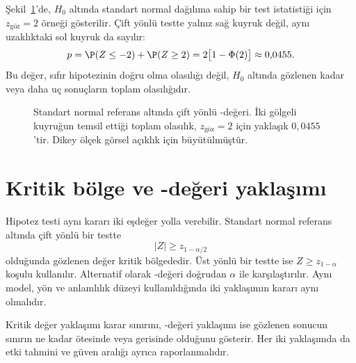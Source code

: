 Şekil~\ref{fig:pvalue-two-tails}'de, $H_0$ altında standart normal
dağılıma sahip bir test istatistiği için $z_{\text{göz}}=2$ örneği
gösterilir. Çift yönlü testte yalnız sağ kuyruk değil, aynı uzaklıktaki
sol kuyruk da sayılır:
\[
p=\P(Z\leq-2)+\P(Z\geq2)
  =2\bigl[1-\Phi(2)\bigr]\approx0{,}0455.
\]
Bu değer, sıfır hipotezinin doğru olma olasılığı değil, $H_0$ altında
gözlenen kadar veya daha uç sonuçların toplam olasılığıdır.

\begin{figure}[H]
\centering
{}
\caption{Standart normal referans altında çift yönlü \pval-değeri.
İki gölgeli kuyruğun temsil ettiği toplam olasılık, $z_{\text{göz}}=2$ için yaklaşık
$0{,}0455$'tir. Dikey ölçek görsel açıklık için büyütülmüştür.}
\label{fig:pvalue-two-tails}
\end{figure}

\section{Kritik bölge ve \pval-değeri yaklaşımı}

Hipotez testi aynı kararı iki eşdeğer yolla verebilir. Standart normal
referans altında çift yönlü bir testte
\[
|Z|\geq z_{1-\alpha/2}
\]
olduğunda gözlenen değer kritik bölgededir. Üst yönlü bir testte ise
$Z\geq z_{1-\alpha}$ koşulu kullanılır. Alternatif olarak \pval-değeri doğrudan
$\alpha$ ile karşılaştırılır. Aynı model, yön ve anlamlılık düzeyi
kullanıldığında iki yaklaşımın kararı aynı olmalıdır.

Kritik değer yaklaşımı karar sınırını, \pval-değeri yaklaşımı ise gözlenen
sonucun sınırın ne kadar ötesinde veya gerisinde olduğunu gösterir. Her iki
yaklaşımda da etki tahmini ve güven aralığı ayrıca raporlanmalıdır.

